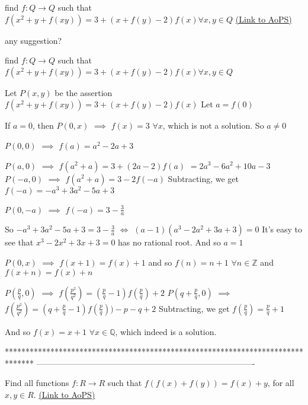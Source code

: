 \begin{problem}
	find $f:Q \to Q$ such that $f(x^2+y+f(xy))=3+(x+f(y)-2)f(x) \forall x,y \in Q$
	\flushright \href{https://artofproblemsolving.com/community/c6h565495}{(Link to AoPS)}
\end{problem}



\begin{solution}
	any suggestion?
\end{solution}



\begin{solution}
	\begin{tcolorbox}find $f:Q \to Q$ such that $f(x^2+y+f(xy))=3+(x+f(y)-2)f(x) \forall x,y \in Q$\end{tcolorbox}
Let $P(x,y)$ be the assertion $f(x^2+y+f(xy))=3+(x+f(y)-2)f(x)$
Let $a=f(0)$

If $a=0$, then $P(0,x)$ $\implies$ $f(x)=3$  $\forall x$, which is not a solution. So $a\ne 0$

$P(0,0)$ $\implies$ $f(a)=a^2-2a+3$

$P(a,0)$ $\implies$ $f(a^2+a)=3+(2a-2)f(a)$ $=2a^3-6a^2+10a-3$
$P(-a,0)$ $\implies$ $f(a^2+a)=3-2f(-a)$
Subtracting, we get $f(-a)=-a^3+3a^2-5a+3$

$P(0,-a)$ $\implies$ $f(-a)=3-\frac 3a$

So $-a^3+3a^2-5a+3=3-\frac 3a$ $\iff$ $(a-1)(a^3-2a^2+3a+3)=0$
It's easy to see that $x^3-2x^2+3x+3=0$ has no rational root. And so $a=1$

$P(0,x)$ $\implies$ $f(x+1)=f(x)+1$ and so $f(n)=n+1$ $\forall n\in\mathbb Z$ and $f(x+n)=f(x)+n$

$P(\frac pq,0)$ $\implies$ $f(\frac{p^2}{q^2})=(\frac pq-1)f(\frac pq)+2$
$P(q+\frac pq,0)$ $\implies$ $f(\frac{p^2}{q^2})=(q+\frac pq-1)f(\frac pq))-p-q+2$
Subtracting, we get $f(\frac pq)=\frac pq+1$

And so $\boxed{f(x)=x+1}$ $\forall x\in\mathbb Q$, which indeed is a solution.
\end{solution}
*******************************************************************************
-------------------------------------------------------------------------------

\begin{problem}
	Find all functions $f:R \to R$ such that  $f(f(x)+f(y))=f(x)+y$, for all $x,y\in R$.
	\flushright \href{https://artofproblemsolving.com/community/c6h565648}{(Link to AoPS)}
\end{problem}



